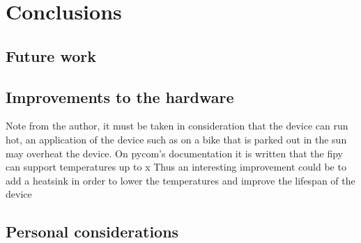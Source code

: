 
\chapter{Conclusions}\label{ch:conclusions}

	\section{Future work}
	
		\section{Improvements to the hardware}
			
			Note from the author, it must be taken in consideration that the device can run hot, an application of the device such as on a bike that is parked out in the sun may overheat the device.
			On pycom's documentation it is written that the fipy can support temperatures up to x
			Thus an interesting improvement could be to add a heatsink in order to lower the temperatures and improve the lifespan of the device

	\section{Personal considerations}
